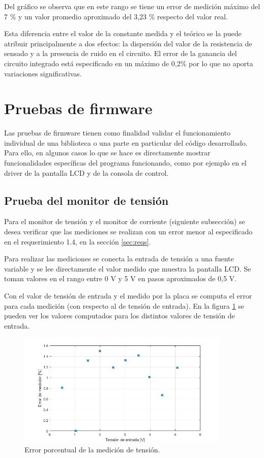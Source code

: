 Del gráfico se observa que en este rango se tiene un error de medición máximo del 7 \% y un valor promedio aproximado del 3,23 \% respecto del valor real.

Esta diferencia entre el valor de la constante medida y el teórico se la puede atribuir principalmente a dos efectos: la dispersión del valor de la resistencia de sensado y a la presencia de ruido en el circuito. El error de la ganancia del circuito integrado está especificado en un máximo de 0,2\% por lo que no aporta variaciones significativas.

\section{Pruebas de firmware}
\label{sec:pruebasFW}

Las pruebas de firmware tienen como finalidad validar el funcionamiento individual de una biblioteca o una parte en particular del código desarrollado. Para ello, en algunos casos lo que se hace es directamente mostrar funcionalidades específicas del programa funcionando, como por ejemplo en el driver de la pantalla LCD y de la consola de control.

\subsection{Prueba del monitor de tensión}

Para el monitor de tensión y el monitor de corriente (siguiente subsección) se desea verificar que las mediciones se realizan con un error menor al especificado en el requerimiento 1.4, en la sección \ref{sec:reqs}.

Para realizar las mediciones se conecta la entrada de tensión a una fuente variable y se lee directamente el valor medido que muestra la pantalla LCD. Se toman valores en el rango entre 0 V y 5 V en pasos aproximados de 0,5 V.

Con el valor de tensión de entrada y el medido por la placa se computa el error para cada medición (con respecto al de tensión de entrada). En la figura \ref{fig:testMonTens} se pueden ver los valores computados para los distintos valores de tensión de entrada.

\begin{figure}[H]
\centering
\includegraphics[width=0.9\textwidth]{./Figures/testMonTens.png}
\caption{Error porcentual de la medición de tensión.}
\label{fig:testMonTens}
\end{figure}

